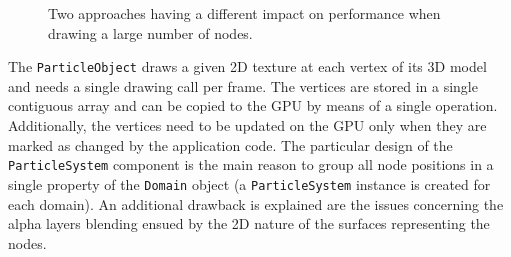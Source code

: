 \begin{figure}
	\hfill
  \caption[Two different approaches to render a large number of nodes.]{Two approaches having a different impact on performance when drawing a large number of nodes.}%
  \label{fig:node-draw}
\end{figure}

The \texttt{ParticleObject} draws a given 2D texture at each vertex of its 3D model and needs a single drawing call per frame. The vertices are stored in a single contiguous array and can be copied to the GPU by means of a single operation. Additionally, the vertices need to be updated on the GPU only when they are marked as changed by the application code. The particular design of the \texttt{ParticleSystem} component is the main reason to group all node positions in a single property of the \texttt{Domain} object (a \texttt{ParticleSystem} instance is created for each domain). An additional drawback is explained are the issues concerning the alpha layers blending ensued by the 2D nature of the surfaces representing the nodes.

